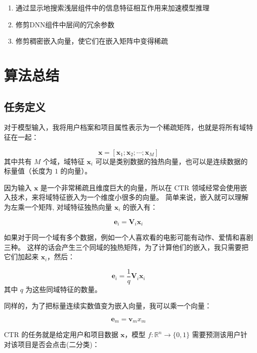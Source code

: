 \documentclass[degree=master,cjk-font=noto]{thuthesis}
\begin{document}
\begin{enumerate}
  \item 通过显示地搜索浅层组件中的信息特征相互作用来加速模型推理
  \item 修剪DNN组件中层间的冗余参数
  \item 修剪稠密嵌入向量，使它们在嵌入矩阵中变得稀疏
\end{enumerate}


\chapter{算法总结}

\section{任务定义}

对于模型输入，我将用户档案和项目属性表示为一个稀疏矩阵，也就是将所有域特征在一起：

\begin{equation}
  \symbf{x} = [\symbf{x}_1; \symbf{x}_2; \cdots; \symbf{x}_M]
\end{equation}
其中共有 $M$ 个域，域特征 $\symbf{x}_i$ 可以是类别数据的独热向量，也可以是连续数据的标量值（长度为 $1$ 的向量）。

因为输入 $\bm{x}$ 是一个非常稀疏且维度巨大的向量，所以在 CTR 领域经常会使用嵌入技术，来将域特征嵌入为一个维度小很多的向量。
简单来说，嵌入就可以理解为左乘一个矩阵, 对域特征独热向量 $\bm{x}_i$ 的嵌入有：

\begin{equation}
  \bm{e}_i = \bm{V}_i \bm{x}_i
\end{equation}

如果对于同一个域有多个数据，例如一个人喜欢看的电影可能有动作、爱情和喜剧三种。
这样的话会产生三个同域的独热矩阵，为了计算他们的嵌入，我只需要把它们加起来 $\bm{x}_i$，然后：

\begin{equation}
  \bm{e}_i = \frac{1}{q} \bm{V}_i \bm{x}_i
\end{equation}
其中 $q$ 为这些同域特征的数量。

同样的，为了把标量连续实数值变为嵌入向量，我可以乘一个向量：

\begin{equation}
  \bm{e}_m = \bm{v}_m x_m
\end{equation}


CTR 的任务就是给定用户和项目数据 $\symbf{x}$，模型 $f: \mathbb{R}^n \rightarrow \{0, 1\}$ 需要预测该用户针对该项目是否会点击(二分类)：
\end{document}
